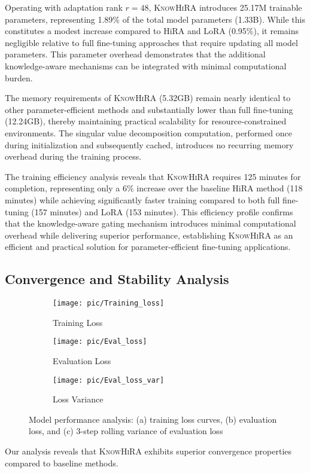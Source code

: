 \documentclass[10pt,letterpaper]{article}
\begin{document}
Operating with adaptation rank $r=48$, \textsc{KnowHiRA} introduces 25.17M trainable parameters, representing 1.89\% of the total model parameters (1.33B). While this constitutes a modest increase compared to HiRA and LoRA (0.95\%), it remains negligible relative to full fine-tuning approaches that require updating all model parameters. This parameter overhead demonstrates that the additional knowledge-aware mechanisms can be integrated with minimal computational burden.

The memory requirements of \textsc{KnowHiRA} (5.32GB) remain nearly identical to other parameter-efficient methods and substantially lower than full fine-tuning (12.24GB), thereby maintaining practical scalability for resource-constrained environments. The singular value decomposition computation, performed once during initialization and subsequently cached, introduces no recurring memory overhead during the training process.

The training efficiency analysis reveals that \textsc{KnowHiRA} requires 125 minutes for completion, representing only a 6\% increase over the baseline HiRA method (118 minutes) while achieving significantly faster training compared to both full fine-tuning (157 minutes) and LoRA (153 minutes). This efficiency profile confirms that the knowledge-aware gating mechanism introduces minimal computational overhead while delivering superior performance, establishing \textsc{KnowHiRA} as an efficient and practical solution for parameter-efficient fine-tuning applications.


\subsection{Convergence and Stability Analysis}
\begin{figure}[!htbp]
    \centering
    \begin{subfigure}[b]{0.32\textwidth}
        \texttt{[image: pic/Training\_loss]}
        \caption{Training Loss}
        \label{fig:train}
    \end{subfigure}
    \hfill
    \begin{subfigure}[b]{0.32\textwidth}
        \texttt{[image: pic/Eval\_loss]}
        \caption{Evaluation Loss}
        \label{fig:eval}
    \end{subfigure}
    \hfill
    \begin{subfigure}[b]{0.32\textwidth}
        \texttt{[image: pic/Eval\_loss\_var]}
        \caption{Loss Variance}
        \label{fig:variance}
    \end{subfigure}
    \caption{Model performance analysis: (a) training loss curves, (b) evaluation loss, and (c) 3-step rolling variance of evaluation loss}
    \label{fig:results}
\end{figure}
Our analysis reveals that \textsc{KnowHiRA} exhibits superior convergence properties compared to baseline methods. 
\end{document}
